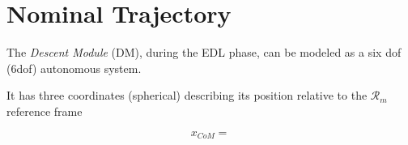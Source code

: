 \chapter{Nominal Trajectory}

The \textit{Descent Module} (DM), during the EDL phase, can be modeled as a
six dof (6dof) autonomous system.

It has three coordinates (spherical) describing its position relative to the
$\mathcal{R}_{m}$ reference frame

$$ x_{CoM} = $$